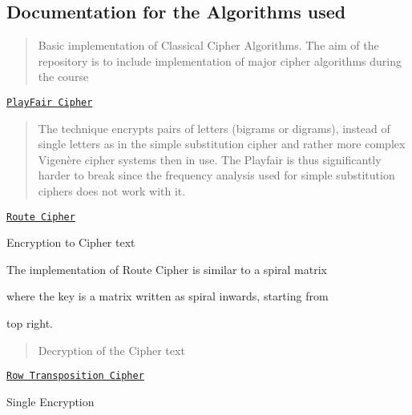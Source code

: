 \subsection*{Documentation for the Algorithms used }

\begin{quote}
Basic implementation of Classical Cipher Algorithms. The aim of the repository is to include implementation of major cipher algorithms during the course \end{quote}



\begin{DoxyEnumerate}
\item \href{https://en.wikipedia.org/wiki/Playfair_cipher}{\tt Play\+Fair Cipher} \begin{quote}
The technique encrypts pairs of letters (bigrams or digrams), instead of single letters as in the simple substitution cipher and rather more complex Vigenère cipher systems then in use. The Playfair is thus significantly harder to break since the frequency analysis used for simple substitution ciphers does not work with it. \end{quote}

\item \href{https://en.wikipedia.org/wiki/Transposition_cipher#Route_cipher}{\tt Route Cipher} \begin{quote}
\end{quote}

\end{DoxyEnumerate}
\begin{DoxyItemize}
\item Encryption to Cipher text
\begin{DoxyItemize}
\item The implementation of Route Cipher is similar to a spiral matrix 
\end{DoxyItemize}
\end{DoxyItemize}


\begin{DoxyItemize}
\item where the key is a matrix written as spiral inwards, starting from
\item top right.
\end{DoxyItemize}

\begin{quote}

\begin{DoxyItemize}
\item Decryption of the Cipher text 
\end{DoxyItemize}\end{quote}



\begin{DoxyEnumerate}
\item \href{https://en.wikipedia.org/wiki/Transposition_cipher#Columnar_transposition}{\tt Row Transposition Cipher} \begin{quote}
\end{quote}

\end{DoxyEnumerate}
\begin{DoxyItemize}
\item Single Encryption
\end{DoxyItemize}